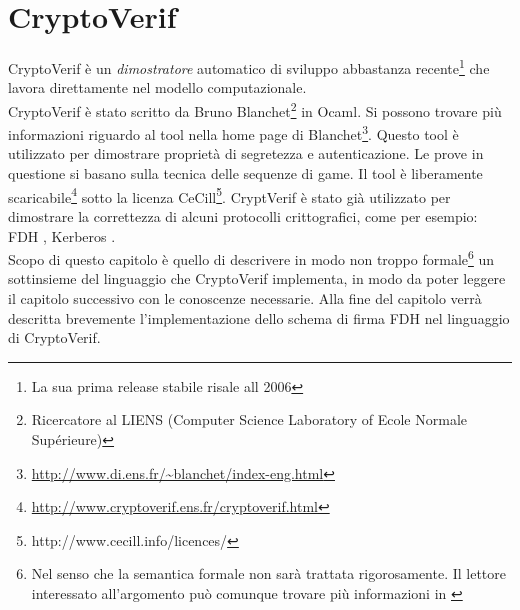 \documentclass[a4paper,openright,twoside,12pt]{report}
\begin{document}
\chapter{CryptoVerif}
CryptoVerif \`e un \emph{dimostratore} automatico di sviluppo abbastanza recente\footnote{La sua prima release stabile risale all 2006} che lavora direttamente nel modello computazionale.\\
CryptoVerif \`e stato scritto da Bruno Blanchet\footnote{Ricercatore al LIENS (Computer Science Laboratory of Ecole Normale Supérieure)} in Ocaml. 
Si possono trovare pi\`u informazioni riguardo al tool nella home page di Blanchet\footnote{\url{http://www.di.ens.fr/~blanchet/index-eng.html}}.
Questo tool \`e utilizzato per dimostrare propriet\`a di segretezza e autenticazione. Le prove in questione  si basano sulla tecnica delle sequenze di game.
Il tool \`e liberamente scaricabile\footnote{\url{http://www.cryptoverif.ens.fr/cryptoverif.html}} sotto la licenza CeCill\footnote{http://www.cecill.info/licences/}.
CryptVerif \`e stato gi\`a utilizzato per dimostrare la correttezza di alcuni protocolli crittografici, come per esempio: FDH \cite{BlanchetPointchevalCrypto06}, 
Kerberos \cite{BlanchetJaggardScedrovTsayAsiaCCS08}.\\
Scopo di questo capitolo \`e quello di descrivere in modo non troppo formale\footnote{Nel senso che la semantica formale non sar\`a trattata rigorosamente. 
Il lettore interessato all'argomento pu\`o comunque trovare pi\`u informazioni in \cite{BlanchetJaggardScedrovTsayAsiaCCS08}} 
un sottinsieme del linguaggio che CryptoVerif implementa, in modo 
da poter leggere il capitolo successivo con le conoscenze necessarie.
Alla fine del capitolo verr\`a descritta brevemente l'implementazione dello schema di firma FDH nel linguaggio di CryptoVerif.
\newpage
\end{document}
